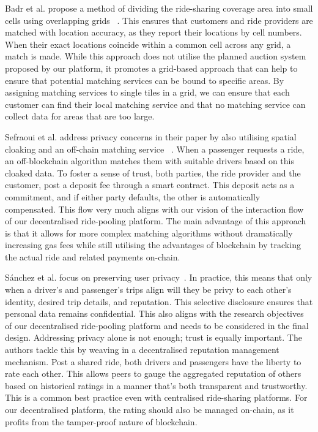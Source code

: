 Badr et al. propose a method of dividing the ride-sharing coverage area into small cells using overlapping grids ~\cite{Badr.}. This ensures that customers and ride providers are matched with location accuracy, as they report their locations by cell numbers. When their exact locations coincide within a common cell across any grid, a match is made. While this approach does not utilise the planned auction system proposed by our platform, it promotes a grid-based approach that can help to ensure that potential matching services can be bound to specific areas. By assigning matching services to single tiles in a grid, we can ensure that each customer can find their local matching service and that no matching service can collect data for areas that are too large.


Sefraoui et al. address privacy concerns in their paper by also utilising spatial cloaking and an off-chain matching service ~\cite{Vazquez.}. When a passenger requests a ride, an off-blockchain algorithm matches them with suitable drivers based on this cloaked data. To foster a sense of trust, both parties, the ride provider and the customer, post a deposit fee through a smart contract. This deposit acts as a commitment, and if either party defaults, the other is automatically compensated. This flow very much aligns with our vision of the interaction flow of our decentralised ride-pooling platform. The main advantage of this approach is that it allows for more complex matching algorithms without dramatically increasing gas fees while still utilising the advantages of blockchain by tracking the actual ride and related payments on-chain. 

Sánchez et al. focus on preserving user privacy~\cite{Sanchez.2016}. In practice, this means that only when a driver's and passenger's trips align will they be privy to each other's identity, desired trip details, and reputation. This selective disclosure ensures that personal data remains confidential. This also aligns with the research objectives of our decentralised ride-pooling platform and needs to be considered in the final design.
Addressing privacy alone is not enough; trust is equally important. The authors tackle this by weaving in a decentralised reputation management mechanism. Post a shared ride, both drivers and passengers have the liberty to rate each other. This allows peers to gauge the aggregated reputation of others based on historical ratings in a manner that's both transparent and trustworthy. This is a common best practice even with centralised ride-sharing platforms. For our decentralised platform, the rating should also be managed on-chain, as it profits from the tamper-proof nature of blockchain.

